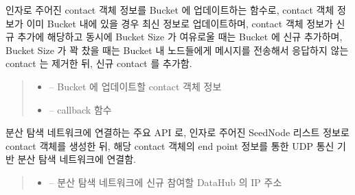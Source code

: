 \documentclass[a4paper,10pt,english]{sphinxmanual}
\begin{document}
\begin{fulllineitems}
\begin{fulllineitems}
\label{\detokenize{_kademlia:KNode._updateContact}}
\pysigstartsignatures
{}
\pysigstopsignatures
\sphinxAtStartPar
인자로 주어진 contact 객체 정보를 Bucket 에 업데이트하는 함수로,
contact 객체 정보가 이미 Bucket 내에 있을 경우 최신 정보로 업데이트하며,
contact 객체 정보가 신규 추가에 해당하고 동시에 Bucket Size 가 여유로울 때는 Bucket 에 신규 추가하며,
Bucket Size 가 꽉 찼을 때는 Bucket 내 노드들에게  메시지를 전송해서 응답하지 않는 contact 는 제거한 뒤, 신규 contact 를 추가함.
\begin{quote}\begin{description}
\begin{itemize}
\item {} 
\sphinxAtStartPar
{} – Bucket 에 업데이트할 contact 객체 정보

\item {} 
\sphinxAtStartPar
{} – callback 함수

\end{itemize}

\end{description}\end{quote}

\end{fulllineitems}


\begin{fulllineitems}
\label{\detokenize{_kademlia:KNode.connect}}
\pysigstartsignatures
{}
\pysigstopsignatures
\sphinxAtStartPar
분산 탐색 네트워크에 연결하는 주요 API 로,
인자로 주어진 SeedNode 리스트 정보로 contact 객체를 생성한 뒤,
해당 contact 객체의 end point 정보를 통한 UDP 통신 기반 분산 탐색 네트워크에 연결함.
\begin{quote}\begin{description}
\begin{itemize}
\item {} 
\sphinxAtStartPar
{} – 분산 탐색 네트워크에 신규 참여할 DataHub 의 IP 주소


\end{itemize}
\end{description}
\end{quote}
\end{fulllineitems}
\end{fulllineitems}
\end{document}
